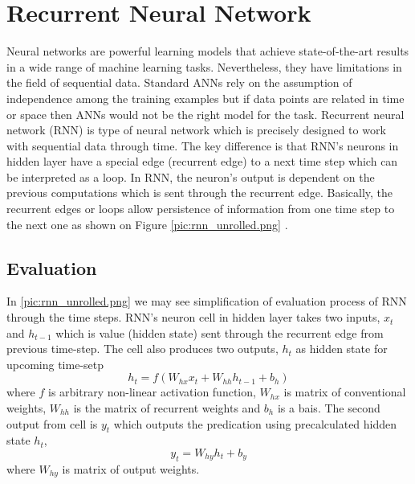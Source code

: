 \chapter{Recurrent Neural Network}

Neural networks are powerful learning models that achieve state-of-the-art results in a wide range of machine learning tasks.
Nevertheless, they have limitations in the field of sequential data.
Standard ANNs rely on the assumption of independence among the training examples but if data points are related in time or space then ANNs would not be the right model for the task\cite{critical_rnn}.
\newline
Recurrent neural network (RNN) is type of neural network which is precisely designed to work with sequential data through time.
The key difference is that RNN's neurons in hidden layer have a special edge (recurrent edge) to a next time step which can be interpreted as a loop.
In RNN, the neuron's output is dependent on the previous computations which is sent through the recurrent edge.
Basically, the recurrent edges or loops allow persistence of information from one time step to the next one as shown on Figure \ref{pic:rnn_unrolled.png} \cite{rnn_generation}.


\section{Evaluation}

In \ref{pic:rnn_unrolled.png} we may see simplification of evaluation process of RNN through the time steps.
RNN's neuron cell in hidden layer takes two inputs, $x_t$ and $h_{t-1}$ which is value (hidden state) sent through the recurrent edge from previous time-step.
The cell also produces two outputs, $h_t$ as hidden state for upcoming time-setp
\[ h_t = f(W_{hx}x_t + W_{hh}h_{t-1} + b_h) \]
where $f$ is arbitrary non-linear activation function, $W_{hx}$ is matrix of conventional weights, $W_{hh}$ is the matrix of recurrent weights and $b_h$ is a bais.
The second output from cell is $y_t$ which outputs the predication using precalculated hidden state $h_t$,
\[ y_t = W_{hy}h_t + b_y \]
where $W_{hy}$ is matrix of output weights.

